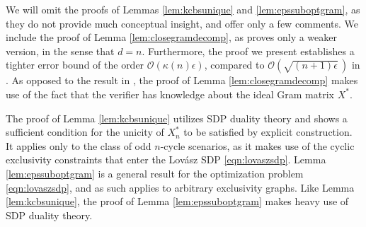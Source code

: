 We will omit the proofs of Lemmas \ref{lem:kcbsunique} and \ref{lem:epssuboptgram}, as they do not provide much conceptual insight, and offer only a few comments. We include the proof of Lemma \ref{lem:closegramdecomp}, as \cite{Bharti2019} proves only a weaker version, in the sense that $d=n$. Furthermore, the proof we present establishes a tighter error bound of the order $\mathcal{O}(\kappa(n)\epsilon)$, compared to $\mathcal{O}(\sqrt{(n+1)\epsilon}\,)$ in \cite{Bharti2019}. As opposed to the result in \cite{Bharti2019}, the proof of Lemma \ref{lem:closegramdecomp} makes use of the fact that the verifier has knowledge about the ideal Gram matrix $X^*$. 

The proof of Lemma \ref{lem:kcbsunique} utilizes SDP duality theory and shows a sufficient condition for the unicity of $X^*_n$ to be satisfied by explicit construction. It applies only to the class of odd $n$-cycle scenarios, as it makes use of the cyclic exclusivity constraints that enter the Lovász SDP \ref{eqn:lovaszsdp}. Lemma \ref{lem:epssuboptgram} is a general result for the optimization problem \ref{eqn:lovaszsdp}, and as such applies to arbitrary exclusivity graphs. Like Lemma \ref{lem:kcbsunique}, the proof of Lemma \ref{lem:epssuboptgram} makes heavy use of SDP duality theory. 

